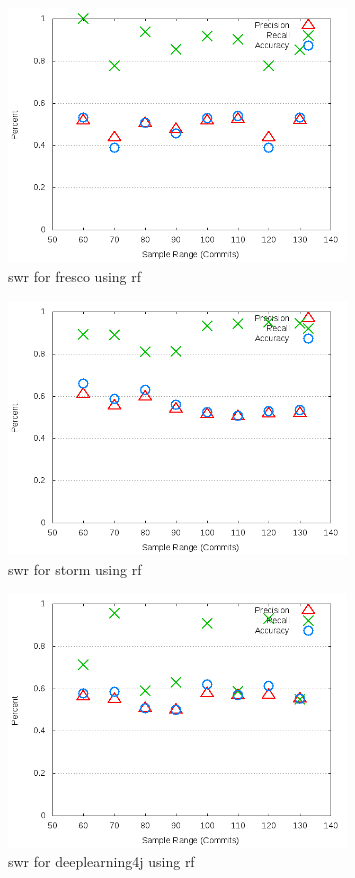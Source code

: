 \begin{figure}[!ht]
    \centering

        \includegraphics[width=0.8\textwidth]{images/rf/test_1/fresco_sample_range}
        \caption{\gls{swr} for fresco using \gls{rf}}
        \label{fig:test_1_fresco_rf}
\end{figure}

\begin{figure}[!ht]
    \centering
        \includegraphics[width=0.8\textwidth]{images/rf/test_1/storm_sample_range}
        \caption{\gls{swr} for storm using \gls{rf}}
        \label{fig:test_1_storm_rf}
\end{figure}

\begin{figure}[!ht]
    \centering
        \includegraphics[width=0.8\textwidth]{images/rf/test_1/deeplearning4j_sample_range}
    \caption{\gls{swr} for deeplearning4j using \gls{rf}}
    \label{fig:test_1_deeplearning4j_rf}
\end{figure}

